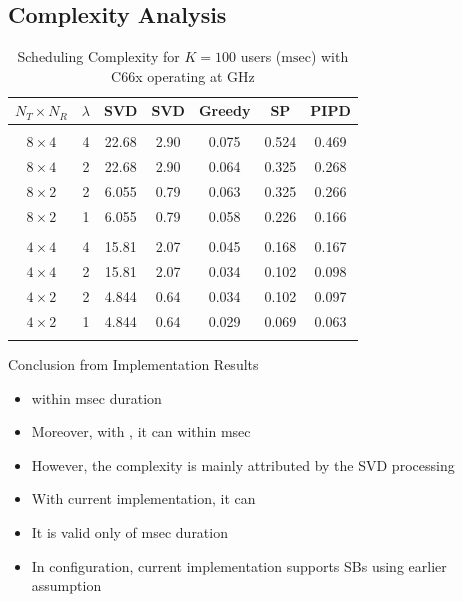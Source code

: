 \documentclass[11pt]{beamer}
\begin{document}
\subsection{Complexity Analysis}

\begin{frame}
\begin{table} \caption{Scheduling Complexity for $K = 100$ users ($\mathrm{msec}$) with C66x operating at GHz} \begin{center} \begin{tabular}{c c c c c c c}
			$N_T \times N_R $ & $\lambda$ & SVD \eqn{(1)} & SVD \eqn{(8)} & Greedy   & SP          & PIPD \\ 
			\hline \\
			$8 \times 4$ & 4 & 22.68 & 2.90 & 0.075 & 0.524 & 0.469 \\ 
			$8 \times 4$ & 2 & 22.68 & 2.90 & 0.064 & 0.325 & 0.268 \\
			$8 \times 2$ & 2 & 6.055 & 0.79 & 0.063 & 0.325 & 0.266 \\
			$8 \times 2$ & 1 & 6.055 & 0.79 & 0.058 & 0.226 & 0.166 \\
			\hline \\
			$4 \times 4$ & 4 & 15.81 & 2.07 & 0.045 & 0.168 & 0.167 \\ 
			$4 \times 4$ & 2 & 15.81 & 2.07 & 0.034 & 0.102 & 0.098 \\
			$4 \times 2$ & 2 & 4.844 & 0.64 & 0.034 & 0.102 & 0.097 \\
			$4 \times 2$ & 1 & 4.844 & 0.64 & 0.029 & 0.069 & 0.063 \\
			\hline \vspace{-0.3in}
		\end{tabular} \label{table:compexity_comparison}\end{center}
\end{table}
\end{frame}

\begin{frame}{Conclusion from Implementation Results}
	\begin{itemize}
		\item {} within  msec duration
		\item Moreover, with , it can  within  msec
		\item However, the complexity is mainly attributed by the SVD processing
		\item With current implementation, it can 
		\item It is valid only  of  msec duration
		\item In  configuration, current implementation supports  SBs using earlier assumption
	\end{itemize}
\end{frame}
\end{document}
